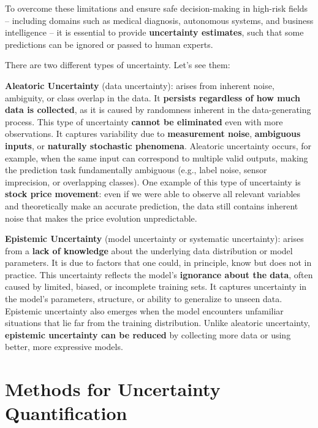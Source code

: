 To overcome these limitations and ensure safe decision-making in high-risk fields – including domains such as medical diagnosis, autonomous systems, and business intelligence – it is essential to provide \textbf{uncertainty estimates}, such that some predictions can be ignored or passed to human experts.

There are two different types of uncertainty. Let's see them:
\begin{compactitemize}

    \item \textbf{Aleatoric Uncertainty} (data uncertainty): arises from inherent noise, ambiguity, or class overlap in the data. It \textbf{persists regardless of how much data is collected}, as it is caused by randomness inherent in the data-generating process. This type of uncertainty \textbf{cannot be eliminated} even with more observations. It captures variability due to \textbf{measurement noise}, \textbf{ambiguous inputs}, or \textbf{naturally stochastic phenomena}. Aleatoric uncertainty occurs, for example, when the same input can correspond to multiple valid outputs, making the prediction task fundamentally ambiguous (e.g., label noise, sensor imprecision, or overlapping classes).  
    One example of this type of uncertainty is \textbf{stock price movement}: even if we were able to observe all relevant variables and theoretically make an accurate prediction, the data still contains inherent noise that makes the price evolution unpredictable.

    \item \textbf{Epistemic Uncertainty} (model uncertainty or systematic uncertainty): arises from a \textbf{lack of knowledge} about the underlying data distribution or model parameters. It is due to factors that one could, in principle, know but does not in practice. This uncertainty reflects the model’s \textbf{ignorance about the data}, often caused by limited, biased, or incomplete training sets. It captures uncertainty in the model’s parameters, structure, or ability to generalize to unseen data. Epistemic uncertainty also emerges when the model encounters unfamiliar situations that lie far from the training distribution. Unlike aleatoric uncertainty, \textbf{epistemic uncertainty can be reduced} by collecting more data or using better, more expressive models.

\end{compactitemize}

\section{Methods for Uncertainty Quantification}


